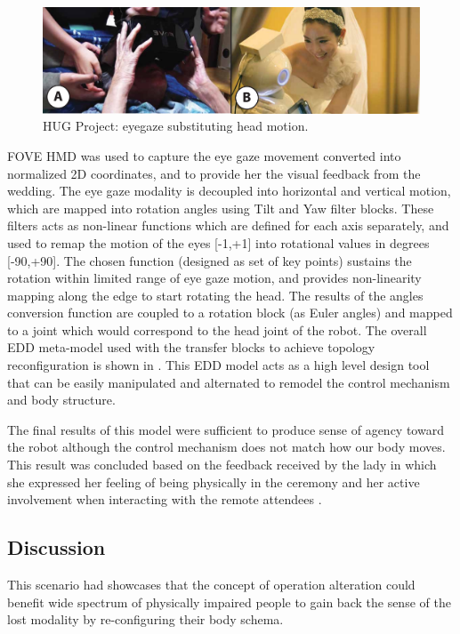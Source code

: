 \begin{figure}[b!]
  \centering
	  \includegraphics[width=1\linewidth]{figures/eval/HUG/Hug.pdf}
  \captionsetup{justification=centering}
  \caption{HUG Project: eyegaze substituting head motion.}
  \label{fig:usability-hug}
\end{figure}

FOVE HMD was used to capture the eye gaze movement converted into normalized 2D coordinates, and to provide her the visual feedback from the wedding. The eye gaze modality is decoupled into horizontal and vertical motion, which are mapped into rotation angles using Tilt and Yaw filter blocks. These filters acts as non-linear functions which are defined for each axis separately, and used to remap the motion of the eyes [-1,+1] into rotational values in degrees [-90,+90]. The chosen function (designed as set of key points) sustains the rotation within limited range of eye gaze motion, and provides non-linearity mapping along the edge to start rotating the head. The results of the angles conversion function are coupled to a rotation block (as Euler angles) and mapped to a joint which would correspond to the head joint of the robot. The overall EDD meta-model used with the transfer blocks to achieve topology reconfiguration is shown in . This EDD model acts as a high level design tool that can be easily manipulated and alternated to remodel the control mechanism and body structure. 
 

The final results of this model were sufficient to produce sense of agency toward the robot although the control mechanism does not match how our body moves. This result was concluded based on the feedback received by the lady in which she expressed her feeling of being physically in the ceremony and her active involvement when interacting with the remote attendees . 


\subsection{Discussion}

This scenario had showcases that the concept of operation alteration could benefit wide spectrum of physically impaired people to gain back the sense of the lost modality by re-configuring their body schema. 

